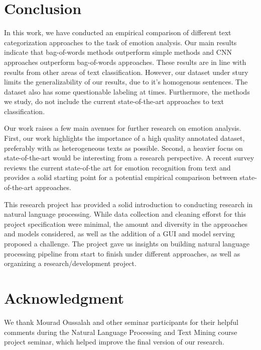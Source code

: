 \documentclass[conference]{IEEEtran}
\begin{document}
\section{Conclusion}

In this work, we have conducted an empirical comparison of different text categorization approaches to the task of emotion analysis. Our main results indicate that bag-of-words methods outperform simple methods and CNN approaches outperform bag-of-words approaches. These results are in line with results from other areas of text classification. However, our dataset under stury limits the generalizability of our results, due to it's homogenous sentences. The dataset also has some questionable labeling at times. Furthermore, the methods we study, do not include the current state-of-the-art approaches to text classification.

Our work raises a few main avenues for further research on emotion analysis. First, our work highlights the importance of a high quality annotated dataset, preferably with as heterogeneous texts as possible. Second, a heavier focus on state-of-the-art would be interesting from a research perspective. A recent survey \cite{alswaidan2020survey} reviews the current state-of-the art for emotion recognition from text and provides a solid starting point for a potential empirical comparison between state-of-the-art approaches.

This research project has provided a solid introduction to conducting research in natural language processing. While data collection and cleaning efforst for this project specification were minimal, the amount and diversity in the approaches and models considered, as well as the addition of a GUI and model serving proposed a challenge. The project gave us insights on building natural language processing pipeline from start to finish under different approaches, as well as organizing a research/development project.

\section*{Acknowledgment}

We thank Mourad Oussalah and other seminar participants for their helpful comments during
 the Natural Language Processing and Text Mining course project seminar, which helped improve the final version of our research.



\end{document}
